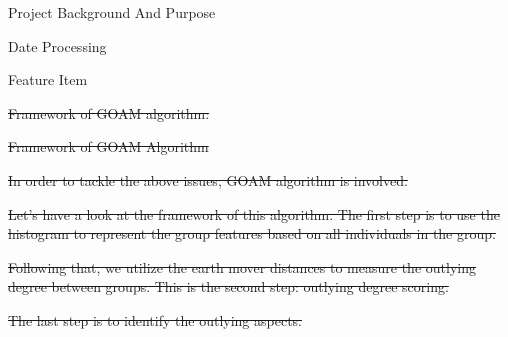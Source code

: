 \documentclass[
 size=14pt,
 paper=smartboard,  %
 mode=present, 		%
 display=slides, 	%
 style=tuliplab,  	%
 pauseslide,
 fleqn,leqno]{powerdot}
\providecommand{\DIFdeltex}[1]{{\protect\color{red}\sout{#1}}}                      %
\providecommand{\DIFdelbegin}{} %
\providecommand{\DIFdelend}{} %
\providecommand{\DIFdelFL}[1]{\DIFdel{#1}} %
\providecommand{\DIFdel}[1]{\texorpdfstring{\DIFdeltex{#1}}{}} %
\newcommand{\DIFscaledelfig}{0.5}
\newlength{\DIFdelgraphicswidth} %
\newlength{\DIFdelgraphicsheight} %
\newcommand{\DIFdelincludegraphics}[2][]{%
\sbox{\DIFdelgraphicsbox}{\DIFOincludegraphics[#1]{#2}}%
\settoboxwidth{\DIFdelgraphicswidth}{\DIFdelgraphicsbox} %
\settoboxtotalheight{\DIFdelgraphicsheight}{\DIFdelgraphicsbox} %
\scalebox{\DIFscaledelfig}{%
\parbox[b]{\DIFdelgraphicswidth}{\usebox{\DIFdelgraphicsbox}\\[-\baselineskip] \rule{\DIFdelgraphicswidth}{0em}}\llap{\resizebox{\DIFdelgraphicswidth}{\DIFdelgraphicsheight}{%
\setlength{\unitlength}{\DIFdelgraphicswidth}%
\begin{picture}(1,1)%
\thicklines\linethickness{2pt} %
{\color[rgb]{1,0,0}\put(0,0){\framebox(1,1){}}}%
{\color[rgb]{1,0,0}\put(0,0){\line( 1,1){1}}}%
{\color[rgb]{1,0,0}\put(0,1){\line(1,-1){1}}}%
\end{picture}%
}\hspace*{3pt}}} %
} %
\DeclareRobustCommand{\DIFdelbegin}{\DIFOdelbegin \let\includegraphics\DIFdelincludegraphics} %
\DeclareRobustCommand{\DIFdelend}{\DIFOaddend \let\includegraphics\DIFOincludegraphics} %
\begin{document}
\begin{slide}
\begin{slide}{Project Background And Purpose}
\begin{slide}{Date Processing}
\begin{slide}{Feature Item}
\DIFdelend %
\DIFdelbegin %
\DIFdelend 

\DIFdelbegin \DIFdel{Framework of GOAM algorithm:
}%


{%
\DIFdelFL{Framework of GOAM Algorithm}} %

\DIFdel{In order to tackle the above issues,
GOAM algorithm is involved.
}%

\DIFdel{Let's have a look at the framework of this algorithm.
The first step is to use the histogram to represent the group features
based on all individuals in the group.
}%

\DIFdel{Following that,
we utilize the earth mover distances to measure the
outlying degree between groups.
This is the second step:
outlying degree scoring.
}%

\DIFdel{The last step is to identify the outlying aspects.
}%


\DIFdelend %




\end{slide}
\end{slide}
\end{slide}
\end{slide}
\end{document}
